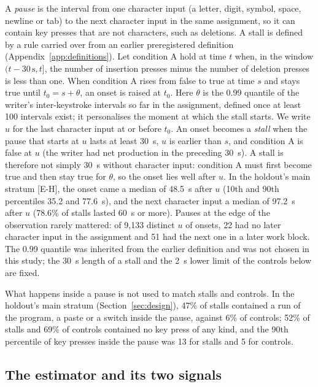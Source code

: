 A \emph{pause} is the interval from one character input (a letter, digit, symbol, space, newline or tab) to the next
character input in the same assignment, so it can contain key presses that are not characters, such as deletions. A
stall is defined by a rule carried over from an earlier preregistered definition (Appendix~\ref{app:definitions}). Let
condition A hold at time $t$ when, in the window $(t - 30\,\mathrm{s}, t]$, the number of insertion presses minus the
number of deletion presses is less than one. When condition A rises from false to true at time $s$ and stays true until
$t_0 = s + \theta$, an onset is raised at $t_0$. Here $\theta$ is the 0.99 quantile of the writer's inter-keystroke
intervals so far in the assignment, defined once at least 100 intervals exist; it personalises the moment at which the
stall starts. We write $u$ for the last character input at or before $t_0$. An onset becomes a \emph{stall} when the
pause that starts at $u$ lasts at least 30~s, $u$ is earlier than $s$, and condition A is false at $u$ (the writer had
net production in the preceding 30~s). A stall is therefore not simply 30~s without character input: condition A must
first become true and then stay true for $\theta$, so the onset lies well after $u$. In the holdout's main stratum
[E-H], the onset came a median of 48.5~s after $u$ (10th and 90th percentiles 35.2 and 77.6~s), and the next character
input a median of 97.2~s after $u$ (78.6\% of stalls lasted 60~s or more). Pauses at the edge of the observation
rarely mattered: of 9,133 distinct $u$ of onsets, 22 had no later character input in the assignment and 51 had the next
one in a later work block. The 0.99 quantile was inherited from the earlier definition and was not chosen
in this study; the 30~s length of a stall and the 2~s lower limit of the controls below are fixed.

What happens inside a pause is not used to match stalls and controls. In the holdout's main stratum
(Section~\ref{sec:design}), 47\% of stalls contained a run of the program, a paste or a switch inside the pause,
against 6\% of controls; 52\% of stalls and 69\% of controls contained no key press of any kind, and the 90th percentile
of key presses inside the pause was 13 for stalls and 5 for controls.

\subsection{The estimator and its two signals}

